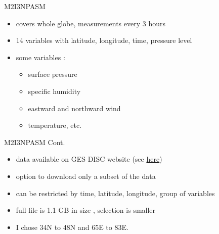 \documentclass[../00_main.tex]{subfiles}
\begin{document}
\begin{frame}{M2I3NPASM}
    \begin{itemize}
        \item covers whole globe, measurements every 3 hours \cite{data-summary}
        \item 14 variables with latitude, longitude, time, pressure level
        \item some variables \cite{data-readme}:
            \begin{itemize}
                \item surface pressure
                \item specific humidity
                \item eastward and northward wind
                \item temperature, etc.
            \end{itemize}
    \end{itemize}
\end{frame}

\begin{frame}{M2I3NPASM Cont.}
    \begin{itemize}
        \item data available on GES DISC website (see 
\href{https://disc.gsfc.nasa.gov/datasets/M2I3NPASM_5.12.4/summary}{here})
        \item option to download only a subset of the data 
        \item can be restricted by time, latitude, longitude, group of variables
        \item full file is 1.1 GB in size \cite{data-readme}, selection is
            smaller
        \item I chose 34\textdegree{}N to 48\textdegree{}N and 65\textdegree{}E 
            to 83\textdegree{}E.
    \end{itemize}
\end{frame}
\end{document}
